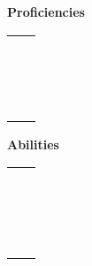 \documentclass[green]{grimrock}
\begin{document}
\name{\gTalents{}}

{\bf Proficiencies}
\begin{table}[h]
\begin{tabular}{lp{13cm}}
{\bf \swordsa{}} &\swordsa{\MYtext}\\
{\bf \swordsb{}} &\swordsb{\MYtext}\\
{\bf \swordSpeed{}} &\swordSpeed{\MYtext}\\
{\bf \axea{}} &\axea{\MYtext}\\
{\bf \axeb{}} &\axeb{\MYtext}\\
{\bf \axeDam{}} &\axeDam{\MYtext}\\
{\bf \rangedb{}} &\rangedb{\MYtext}\\
{\bf \throwa{}} &\throwa{\MYtext}\\
{\bf \throwb{}} &\throwb{\MYtext}\\
{\bf \firea{}} &\firea{\MYtext}\\
{\bf \fireb{}} &\fireb{\MYtext}\\
{\bf \lightninga{}} &\lightninga{\MYtext}\\
{\bf \lightningb{}} &\lightningb{\MYtext}\\
{\bf \eartha{}} &\eartha{\MYtext}\\
{\bf \earhtb{}} &\earhtb{\MYtext}\\
{\bf \armor{}} &\armor{\MYtext}\\
\end{tabular}
\end{table}

{\bf Abilities}
\begin{table}[h]
\begin{tabular}{lp{13cm}}
{\bf \sack{}} &\sack{\MYtext}\\
{\bf \hp{}} &\hp{\MYtext}\\
{\bf \levitate{}} &\levitate{\MYtext}\\
{\bf \hpTransfer{}} &\hpTransfer{\MYtext}\\
{\bf \lucid{}} &\lucid{\MYtext}\\
{\bf \mem{}} &\mem{\MYtext}\\
{\bf \daze{}} &\daze{\MYtext}\\
{\bf \alchemy{}} &\alchemy{\MYtext}\\
{\bf \push{}} &\push{\MYtext}\\
{\bf \fireres{}} &\fireres{\MYtext}\\
{\bf \lightres{}} &\lightres{\MYtext}\\
{\bf \poires{}} &\poires{\MYtext}\\
{\bf \ammo{}} &\ammo{\MYtext}\\
{\bf \guard{}} &\guard{\MYtext}\\
{\bf \dodge{}} &\dodge{\MYtext}\\
{\bf \extraheal{}} &\extraheal{\MYtext}\\
{\bf \extraspeed{}} &\extraspeed{\MYtext}\\
\end{tabular}
\end{table}
\end{document}
